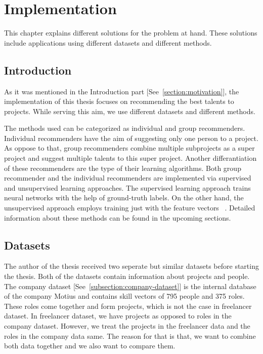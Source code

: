 
\chapter{Implementation}\label{chapter:implementation}

This chapter explains different solutions for the problem at hand. These solutions include applications using different datasets and different methods.

\section{Introduction}

As it was mentioned in the Introduction part [See~\autoref{section:motivation}], the implementation of this thesis focuses on recommending the best talents to projects. While serving this aim, we use different datasets and different methods. 


The methods used can be categorized as individual and group recommenders. Individual recommenders have the aim of suggesting only one person to a project. As oppose to that, group recommenders combine multiple subprojects as a super project and suggest multiple talents to this super project. Another differantiation of these recommenders are the type of their learning algorithms. Both group recommender and the individual recommenders are implemented via supervised and unsupervised learning approaches. The supervised learning approach trains neural networks with the help of ground-truth labels. On the other hand, the unsupervised approach employs training just with the feature vectors ~\parencite{sathya2013comparison}. Detailed information about these methods can be found in the upcoming sections. 

\section{Datasets}

The author of the thesis received two seperate but similar datasets before starting the thesis. Both of the datasets contain information about projects and people. The company dataset [See~\autoref{subsection:company-dataset}] is the internal database of the company Motius and contains skill vectors of 795 people and 375 roles. These roles come together and form projects, which is not the case in freelancer dataset. In freelancer dataset, we have projects as opposed to roles in the company dataset. However, we treat the projects in the freelancer data and the roles in the company data same. The reason for that is that, we want to combine both data together and we also want to compare them.


